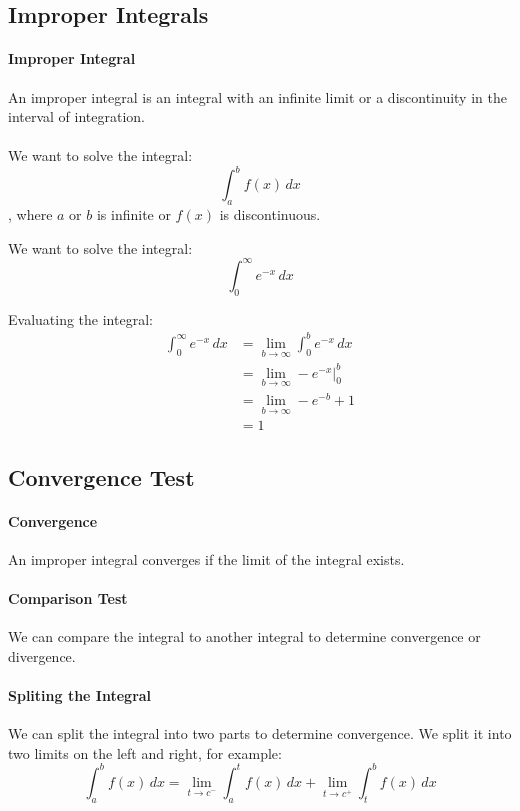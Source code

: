 \documentclass[11pt]{article}
\begin{document}
\subsection{Improper Integrals}
\paragraph{Improper Integral} An improper integral is an integral with an infinite limit or a discontinuity in the interval of integration.
\paragraph{} We want to solve the integral:
\begin{equation}
    \int_a^b f(x) \, dx
\end{equation}
, where $a$ or $b$ is infinite or $f(x)$ is discontinuous.
\begin{example}
We want to solve the integral:
$$ \int_0^\infty e^{-x} \, dx $$

Evaluating the integral:
\begin{align*}
    \int_0^\infty e^{-x} \, dx &= \lim_{b \to \infty} \int_0^b e^{-x} \, dx \\
    &= \lim_{b \to \infty} -e^{-x} \Big|_0^b \\
    &= \lim_{b \to \infty} -e^{-b} + 1 \\
    &= 1
\end{align*}
\end{example}
\subsection{Convergence Test}
\paragraph{Convergence} An improper integral converges if the limit of the integral exists. 
\paragraph{Comparison Test} We can compare the integral to another integral to determine convergence or divergence.
\paragraph{Spliting the Integral} We can split the integral into two parts to determine convergence. We split it into two limits on the left and right, for example:
$$ \int_a^b f(x)\, dx = \lim_{t \to c^-} \int_a^t f(x) \, dx + \lim_{t \to c^+} \int_t^b f(x) \, dx $$
\end{document}
